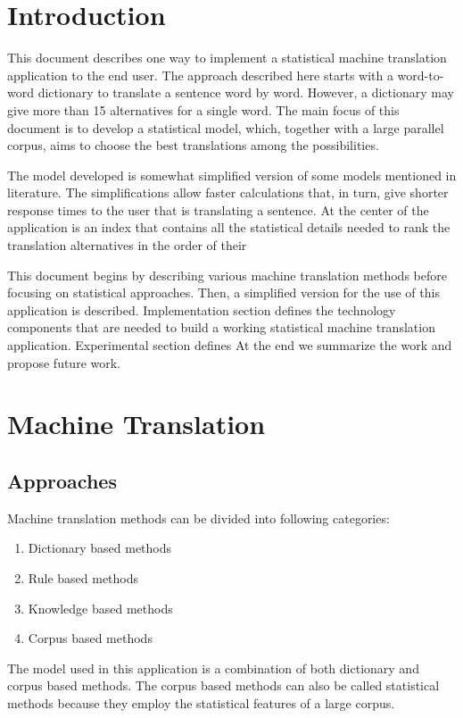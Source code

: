 \documentclass[12pt]{article}
\begin{document}


\newpage

\section{Introduction}
This document describes one way to implement a statistical machine translation application to the end user.
The approach described here starts with a word-to-word dictionary to translate a sentence word by word.
However, a dictionary may give more than 15 alternatives for a single word.
The main focus of this document is to develop a statistical model, which, together with a large parallel corpus, aims to choose the best translations among the possibilities.

The model developed is somewhat simplified version of some models mentioned in literature.
The simplifications allow faster calculations that, in turn, give shorter response times to the user that is translating a sentence.
At the center of the application is an index that contains all the statistical details needed to rank the translation alternatives in the order of their 


This document begins by describing various machine translation methods before focusing on statistical approaches.
Then, a simplified version for the use of this application is described.
Implementation section defines the technology components that are needed to build a working statistical machine translation application.
Experimental section defines 
At the end we summarize the work and propose future work.



\section{Machine Translation}
\subsection{Approaches}
Machine translation methods can be divided into following categories:
\begin{enumerate}
	\item Dictionary based methods
	\item Rule based methods
	\item Knowledge based methods
	\item Corpus based methods
\end{enumerate}

The model used in this application is a combination of both dictionary and corpus based methods.
The corpus based methods can also be called statistical methods because they employ the statistical features of a large corpus.
\end{document}
